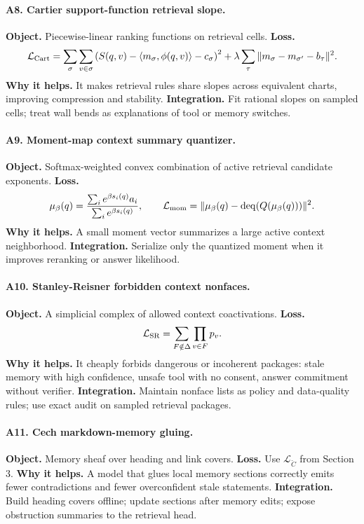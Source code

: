 \documentclass[11pt]{article}
\newcommand{\loss}{\mathcal{L}}
\numberwithin{equation}{section}
\begin{document}
\paragraph{A8. Cartier support-function retrieval slope.}
\textbf{Object.} Piecewise-linear ranking functions on retrieval cells. \textbf{Loss.}
\begin{equation}
\loss_{\rm Cart}=\sum_{\sigma}\sum_{v\in\sigma}\left(S(q,v)-\langle m_\sigma,\phi(q,v)\rangle-c_\sigma\right)^2+\lambda\sum_{\tau}\|m_{\sigma}-m_{\sigma'}-b_\tau\|^2.
\end{equation}
\textbf{Why it helps.} It makes retrieval rules share slopes across equivalent charts, improving compression and stability. \textbf{Integration.} Fit rational slopes on sampled cells; treat wall bends as explanations of tool or memory switches.

\paragraph{A9. Moment-map context summary quantizer.}
\textbf{Object.} Softmax-weighted convex combination of active retrieval candidate exponents. \textbf{Loss.}
\begin{equation}
\mu_\beta(q)=\frac{\sum_i e^{\beta s_i(q)}a_i}{\sum_i e^{\beta s_i(q)}},\qquad \loss_{\rm mom}=\|\mu_\beta(q)-\operatorname{deq}(Q(\mu_\beta(q)))\|^2.
\end{equation}
\textbf{Why it helps.} A small moment vector summarizes a large active context neighborhood. \textbf{Integration.} Serialize only the quantized moment when it improves reranking or answer likelihood.

\paragraph{A10. Stanley-Reisner forbidden context nonfaces.}
\textbf{Object.} A simplicial complex of allowed context coactivations. \textbf{Loss.}
\begin{equation}
\loss_{\rm SR}=\sum_{F\notin\Delta}\prod_{v\in F}p_v.
\end{equation}
\textbf{Why it helps.} It cheaply forbids dangerous or incoherent packages: stale memory with high confidence, unsafe tool with no consent, answer commitment without verifier. \textbf{Integration.} Maintain nonface lists as policy and data-quality rules; use exact audit on sampled retrieval packages.

\paragraph{A11. Cech markdown-memory gluing.}
\textbf{Object.} Memory sheaf over heading and link covers. \textbf{Loss.} Use $\loss_{\check C}$ from Section 3. \textbf{Why it helps.} A model that glues local memory sections correctly emits fewer contradictions and fewer overconfident stale statements. \textbf{Integration.} Build heading covers offline; update sections after memory edits; expose obstruction summaries to the retrieval head.
\end{document}
